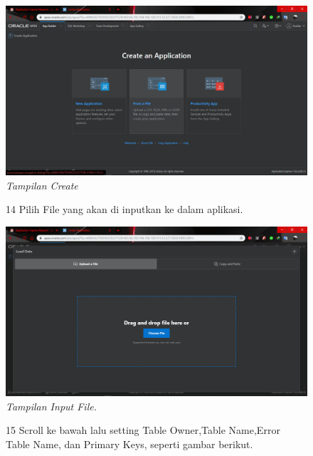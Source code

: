 \begin{enumerate}
\begin{figure}
    \begin{center}
\includegraphics[scale=0.2]{figures/3.png}
    \caption{\textit{Tampilan Create}}
        \end{center}
\label{gambar}
\end{figure}

\begin{figure}
\item[14] Pilih File yang akan di inputkan ke dalam aplikasi.

    \begin{center}
\includegraphics[scale=0.2]{figures/4.png}
    \caption{\textit{Tampilan Input File.}}
        \end{center}
\label{gambar}
\end{figure}

\begin{figure}
\item[15] Scroll ke bawah lalu setting Table Owner,Table Name,Error Table Name, dan Primary Keys, seperti gambar berikut.


\end{figure}
\end{enumerate}
